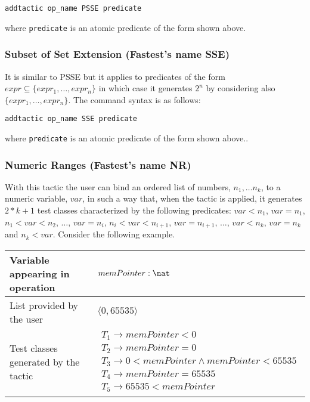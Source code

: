 \begin{verbatim}
addtactic op_name PSSE predicate
\end{verbatim}

\noindent where \verb+predicate+ is an atomic predicate of the form shown above.

\subsubsection{Subset of Set Extension (Fastest's name SSE)}
It is similar to PSSE but it applies to predicates of the form $expr \subseteq \{expr_{1}, \dots, expr_{n}\}$ in which case it generates $2^{n}$ by considering also $\{expr_{1}, \dots, expr_{n}\}$. The command syntax is as follows:

\begin{verbatim}
addtactic op_name SSE predicate
\end{verbatim}

\noindent where \verb+predicate+ is an atomic predicate of the form shown above..

\subsubsection{\label{nr}Numeric Ranges (Fastest's name NR)}
With this tactic the user can bind an ordered list of numbers, $n_{1}, \dots n_{k}$, to a numeric variable, $var$, in such a way that, when the tactic is applied, it generates $2 * k + 1$ test classes characterized by the following predicates: $var < n_{1}$, $var = n_{1}$, $n_{1} < var < n_{2}$, $\dots$, $var = n_{i}$, $n_{i} < var < n_{i+1}$, $var = n_{i+1}$, $\dots$, $var < n_{k}$, $var = n_{k}$ and $n_{k} < var$. Consider the following example.

\vspace{5mm}\begin{tabular}{ll}\hline
Variable appearing in operation & $memPointer: \nat$ \\\hline

List provided by the user & $\langle 0, 65535 \rangle$ \\\hline

Test classes generated by the tactic & 
$\begin{array}{l}
T_{1} \rightarrow memPointer < 0 \\
T_{2} \rightarrow memPointer = 0 \\
T_{3} \rightarrow 0 < memPointer \land memPointer < 65535 \\
T_{4} \rightarrow memPointer = 65535 \\
T_{5} \rightarrow 65535 < memPointer
\end{array}$ \\\hline
\end{tabular}\vspace{5mm}

